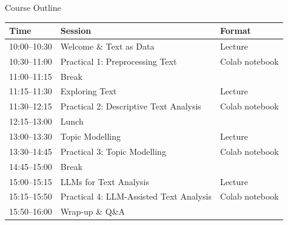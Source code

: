 \documentclass[aspectratio=169]{beamer}
\begin{document}
\begin{frame}{Course Outline}
    \footnotesize
    \begin{tabular}{@{}lll@{}}
        \toprule
        \textbf{Time} & \textbf{Session} & \textbf{Format} \\
        \midrule
        10:00--10:30 & Welcome \& Text as Data & Lecture \\
        10:30--11:00 & \alert{Practical 1: Preprocessing Text} & Colab notebook \\
        11:00--11:15 & Break & \\
        11:15--11:30 & Exploring Text & Lecture \\
        11:30--12:15 & \alert{Practical 2: Descriptive Text Analysis} & Colab notebook \\
        12:15--13:00 & Lunch & \\
        13:00--13:30 & Topic Modelling & Lecture \\
        13:30--14:45 & \alert{Practical 3: Topic Modelling} & Colab notebook \\
        14:45--15:00 & Break & \\
        15:00--15:15 & LLMs for Text Analysis & Lecture \\
        15:15--15:50 & \alert{Practical 4: LLM-Assisted Text Analysis} & Colab notebook \\
        15:50--16:00 & Wrap-up \& Q\&A & \\
        \bottomrule
    \end{tabular}
\end{frame}
\end{document}
